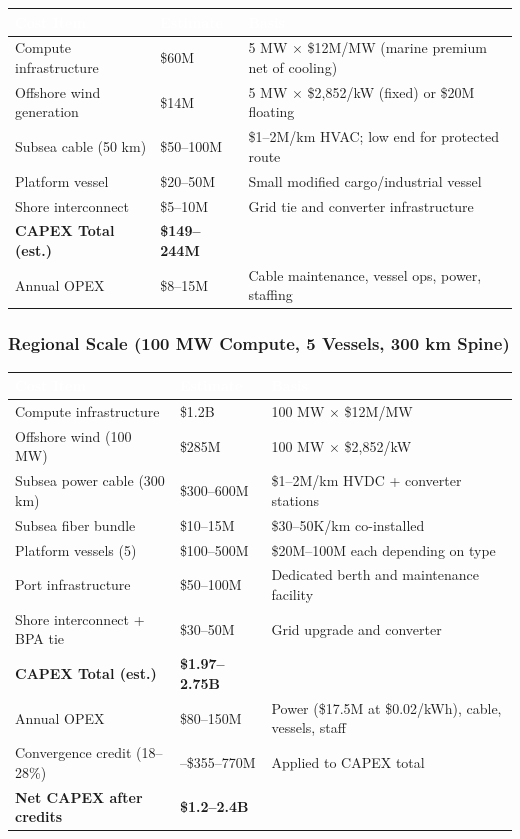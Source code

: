 \documentclass[11pt,letterpaper]{article}
\newcommand{\tableheader}[1]{\textbf{\sffamily\textcolor{white}{#1}}}
\begin{document}
\begin{center}
\begin{tabularx}{\textwidth}{L{5cm}C{3cm}X}
\toprule
{}
\tableheader{Cost Item} & \tableheader{Estimate} & \tableheader{Basis} \\
\midrule
Compute infrastructure & \$60M & 5 MW $\times$ \$12M/MW (marine premium net of cooling) \\
Offshore wind generation & \$14M & 5 MW $\times$ \$2,852/kW (fixed) or \$20M floating \\
Subsea cable (50 km) & \$50--100M & \$1--2M/km HVAC; low end for protected route \\
Platform vessel & \$20--50M & Small modified cargo/industrial vessel \\
Shore interconnect & \$5--10M & Grid tie and converter infrastructure \\
\textbf{CAPEX Total (est.)} & \textbf{\$149--244M} & \\
Annual OPEX & \$8--15M & Cable maintenance, vessel ops, power, staffing \\
\bottomrule
\end{tabularx}
\end{center}

\subsubsection{Regional Scale (100 MW Compute, 5 Vessels, 300 km Spine)}

\begin{center}
\begin{tabularx}{\textwidth}{L{5cm}C{3cm}X}
\toprule
{}
\tableheader{Cost Item} & \tableheader{Estimate} & \tableheader{Basis} \\
\midrule
Compute infrastructure & \$1.2B & 100 MW $\times$ \$12M/MW \\
Offshore wind (100 MW) & \$285M & 100 MW $\times$ \$2,852/kW \\
Subsea power cable (300 km) & \$300--600M & \$1--2M/km HVDC + converter stations \\
Subsea fiber bundle & \$10--15M & \$30--50K/km co-installed \\
Platform vessels (5) & \$100--500M & \$20M--100M each depending on type \\
Port infrastructure & \$50--100M & Dedicated berth and maintenance facility \\
Shore interconnect + BPA tie & \$30--50M & Grid upgrade and converter \\
\textbf{CAPEX Total (est.)} & \textbf{\$1.97--2.75B} & \\
Annual OPEX & \$80--150M & Power (\$17.5M at \$0.02/kWh), cable, vessels, staff \\
Convergence credit (18--28\%) & --\$355--770M & Applied to CAPEX total \\
\textbf{Net CAPEX after credits} & \textbf{\$1.2--2.4B} & \\
\bottomrule
\end{tabularx}
\end{center}
\end{document}

